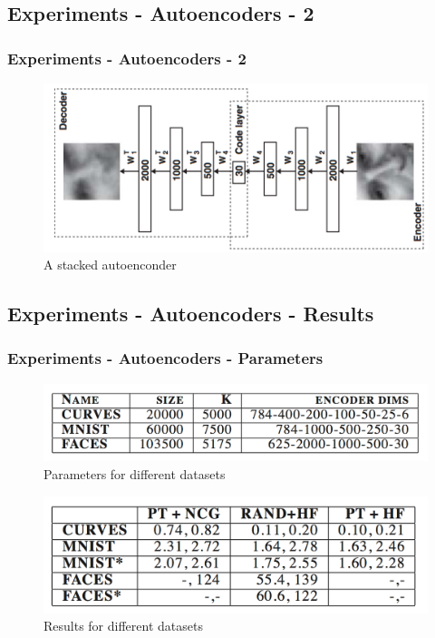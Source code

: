 \documentclass[professionalfont]{beamer}
\begin{document}
  \subsection{Experiments - Autoencoders - 2}
  \begin{frame}

    \frametitle{Experiments - Autoencoders - 2}
    \begin{figure}
      \centering
      \includegraphics[scale=0.6]{autoenc.png}
      \caption{A stacked autoenconder}
      \label{}
    \end{figure}
  \end{frame}

  \subsection{Experiments - Autoencoders - Results}
  \begin{frame}
    \frametitle{Experiments - Autoencoders - Parameters}
    \begin{figure}
      \centering
      \includegraphics[scale=0.4]{parameters.png}
      \caption{Parameters for different datasets}
      \label{}
    \end{figure}
    \begin{figure}
      \centering
      \includegraphics[scale=0.4]{res1.png}
      \caption{Results for different datasets}
      \label{}
    \end{figure}

  \end{frame}
\end{document}
